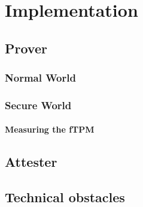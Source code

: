 
\chapter{Implementation}\label{chapter:implementation}

\section{Prover}
\subsection{Normal World}

\subsection{Secure World}

\subsubsection{Measuring the fTPM}

\section{Attester}

\section{Technical obstacles}
